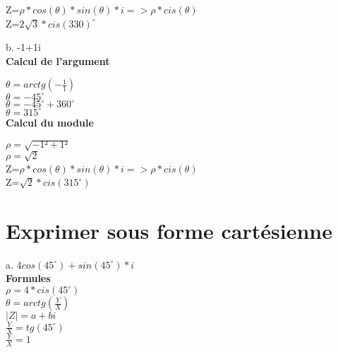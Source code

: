 Z=$\rho * cos(\theta)*sin(\theta)*i => \rho * cis(\theta)$ \\

Z=$ 2\sqrt{3} * cis(330)^{\circ} $ \\

\vspace{5mm} %

b.  -1+1i \\

\textbf{Calcul de l'argument} \\
\vspace{3mm} %

$\theta = arctg(-\frac{1} {1})$ \\
$\theta = -45^{\circ}$ \\
$\theta = -45^{\circ} + 360^{\circ}$ \\
$\theta = 315^{\circ}$ \\

\textbf{Calcul du module} \\
\vspace{3mm} %

$\rho = \sqrt{-1²+1²}$ \\
$\rho = \sqrt{2}$ \\

Z=$\rho * cos(\theta)*sin(\theta)*i => \rho * cis(\theta)$ \\

Z=$ \sqrt{2} * cis(315^{\circ}) $ \\

\newpage

\vspace{3mm} %
\section{Exprimer sous forme cartésienne}
\vspace{3mm} %

a. $4cos(45^{\circ}) + sin(45^{\circ}) *i$ \\

\textbf{Formules} \\
$\rho = 4 * cis(45^{\circ})$\\
$\theta = arctg(\frac{Y}{X})$ \\
$|Z| = a+bi $\\

\vspace{3mm} %
$\frac{Y}{X} = tg(45^{\circ})$\\
$\frac{Y}{X} = 1$\\

